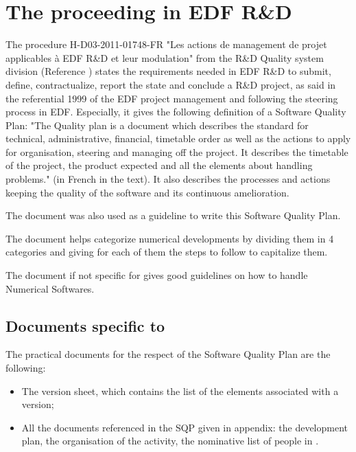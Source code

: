 \chapter{The proceeding in EDF R\&D}

The procedure H-D03-2011-01748-FR "Les actions de management de projet
applicables à EDF R\&D et leur modulation" from the R\&D Quality system
division (Reference \cite{projmanag}) states the requirements needed in EDF
R\&D to submit, define, contractualize, report the state and conclude a R\&D
project, as said in the referential 1999 of the EDF project management and
following the steering process in EDF. Especially, it gives the following
definition of a Software Quality Plan: "The Quality plan is a document which
describes the standard for technical, administrative, financial, timetable
order as well as the actions to apply for organisation, steering and managing
off the project. It describes the timetable of the project, the product
expected and all the elements about handling problems." (in French in the
text). It also describes the processes and actions keeping the quality of the
software and its continuous amelioration.

The document \cite{guidepql} was also used as a guideline to write this Software
Quality Plan.

The document \cite{capelemnum} helps categorize numerical developments by
dividing them in 4 categories and giving for each of them the steps to follow
to capitalize them.

The document \cite{Ocs} if not specific for \telemacsystem gives good guidelines on how
to handle Numerical Softwares.

\section{Documents specific to \telemacsystem}

The practical documents for the respect of the Software Quality Plan are the
following:
\begin{itemize}
\item The version sheet, which contains the list of the elements associated
with a version;
\item All the documents referenced in the SQP given in appendix: the
development plan, the organisation of the \telemacsystem activity, the nominative list
of people in \telemacsystem.
\end{itemize}
